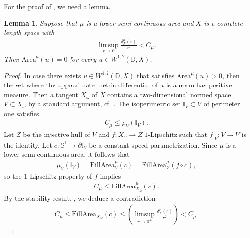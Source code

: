 \documentclass[a4paper,leqno]{amsart}
\numberwithin{equation}{section}
\newtheorem{lemma}[theorem]{Lemma}
\theoremstyle{remark}
\theoremstyle{remark}
\begin{document}
For the proof of , we need a lemma.
\begin{lemma}\label{lemma-degenerate-area}
Suppose that $\mu$ is a lower semi-continuous area and $X$ is a complete length space with
\begin{align*}
    \limsup_{ r \rightarrow 0 } \frac{ \delta_{X}^{\mu}(r) }{ r^2 } < C_\mu.
\end{align*}
Then $\mathrm{Area}^{\mu}(u) = 0$ for every $u \in W^{1,2}( \mathbb{D}, X )$.
\end{lemma}
\begin{proof}
    In case there exists $u \in W^{1,2}( \mathbb{D}, X )$ that satisfies $\mathrm{Area}^{\mu}(u ) > 0$, then the set where the approximate metric differential of $u$ is a norm has positive measure. Then a tangent $X_\omega$ of $X$ contains a two-dimensional normed space $V \subset X_\omega$ by a standard argument, cf. \cite[Proposition 11.2]{Lyt:Wen:17:areamini}. The isoperimetric set $\mathbb{I}_V \subset V$ of perimeter one satisfies
    \begin{align*}
        C_\mu \leq \mu_{V}( \mathbb{I}_V ).
    \end{align*}
    Let $Z$ be the injective hull of $V$ and $f \colon X_\omega \to Z$ $1$-Lipschitz such that $f|_{V} \colon V \to V$ is the identity. Let $c \colon \mathbb{S}^1 \to \partial \mathbb{I}_V$ be a constant speed parametrization. Since $\mu$ is a lower semi-continuous area, it follows that
    \begin{align*}
        \mu_{V}( \mathbb{I}_V ) = \mathrm{FillArea}_{V}^{\mu}( c ) = \mathrm{FillArea}_{Z}^{\mu}( f \circ c ),
    \end{align*}
    so the $1$-Lipschitz property of $f$ implies
    \begin{align*}
        C_\mu \leq \mathrm{FillArea}_{X_\omega}^{\mu}(c).
    \end{align*}
    By the stability result, , we deduce a contradiction
    \begin{align*}
        C_\mu
        \leq
        \mathrm{FillArea}_{X_\omega}( c )
        \leq
        \left( \limsup_{ r \rightarrow 0^{+} } \frac{ \delta^{\mu}_X(r) }{ r^2 } \right)
        <
        C_\mu.
    \end{align*}
\end{proof}
\end{document}
